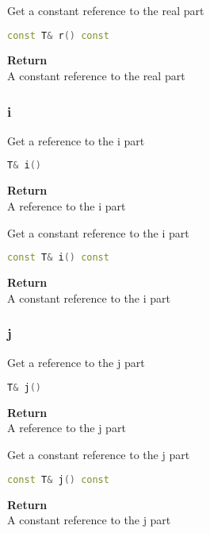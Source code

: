 \begin{mdframed}
Get a constant reference to the real part
\begin{lstlisting}[language=C++]
const T& r() const
\end{lstlisting}
\textbf{Return} \\ 
A constant reference to the real part\\ 
\end{mdframed}

\subsubsection{i}
\begin{mdframed}
Get a reference to the i part
\begin{lstlisting}[language=C++]
T& i()
\end{lstlisting}
\textbf{Return} \\ 
A reference to the i part\\ 
\end{mdframed}

\begin{mdframed}
Get a constant reference to the i part
\begin{lstlisting}[language=C++]
const T& i() const
\end{lstlisting}
\textbf{Return} \\ 
A constant reference to the i part\\ 
\end{mdframed}

\subsubsection{j}
\begin{mdframed}
Get a reference to the j part
\begin{lstlisting}[language=C++]
T& j()
\end{lstlisting}
\textbf{Return} \\ 
A reference to the j part\\ 
\end{mdframed}

\begin{mdframed}
Get a constant reference to the j part
\begin{lstlisting}[language=C++]
const T& j() const
\end{lstlisting}
\textbf{Return} \\ 
A constant reference to the j part\\ 
\end{mdframed}

